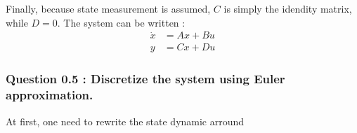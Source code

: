 Finally, because state measurement is assumed, $C$ is simply the idendity matrix, while $D = 0$. The system can be written : 
\begin{align}
    \dot{x} &= Ax + Bu\\
    y &= Cx + Du
\end{align}


\subsubsection*{Question 0.5 : Discretize the system using Euler approximation.}
At first, one need to rewrite the state dynamic arround


